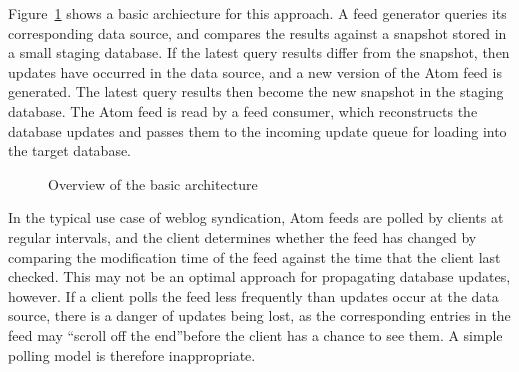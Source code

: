 \documentclass{CRPITStyle}
\begin{document}
Figure~\ref{fig-basic} shows a basic archiecture for this approach. A
feed generator queries its corresponding data source, and compares the
results against a snapshot stored in a small staging database. If the
latest query results differ from the snapshot, then updates have
occurred in the data source, and a new version of the Atom feed is
generated. The latest query results then become the new snapshot in the
staging database. The Atom feed is read by a feed consumer, which
reconstructs the database updates and passes them to the incoming update
queue for loading into the target database.


\begin{figure}[htb]
	\caption{Overview of the basic architecture}
	\label{fig-basic}
\end{figure}


In the typical use case of weblog syndication, Atom feeds are polled by
clients at regular intervals, and the client determines whether the feed
has changed by comparing the modification time of the feed against the
time that the client last checked. This may not be an optimal approach
for propagating database updates, however. If a client polls the feed
less frequently than updates occur at the data source, there is a danger
of updates being lost, as the corresponding entries in the feed may
``scroll off the end''before the client has a chance to see them. A
simple polling model is therefore inappropriate.
\end{document}
